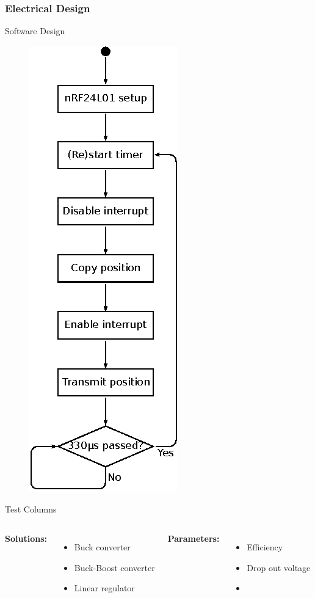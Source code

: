 \documentclass[mathserif]{beamer}
\begin{document}
\begin{frame}[t]\frametitle{Electrical Design}
    
\end{frame}

\begin{frame}{Software Design}
	\begin{figure}
	\centering
	  \includegraphics[width=.25\linewidth]{graphics/joint_software_diagram}
	\end{figure}
\end{frame}




\begin{frame}[c]{Test Columns}
\begin{columns}
\textbf{Solutions:}   
\begin{itemize}
			\item Buck converter
			\item Buck-Boost converter
			\item Linear regulator
\end{itemize}
\textbf{Parameters:}
\begin{itemize}
			\item Efficiency
			\item Drop out voltage
			\item []
\end{itemize}
\end{columns}
\end{frame}
\end{document}
